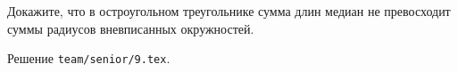 \problem{}
Докажите, что в остроугольном треугольнике сумма длин медиан не превосходит
суммы радиусов вневписанных окружностей.

\solution
Решение \texttt{team/senior/9.tex}.
\endproblem
